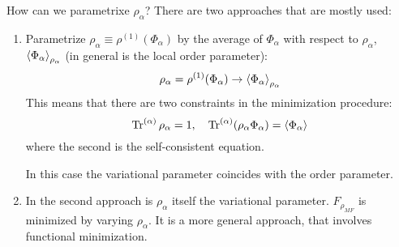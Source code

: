 \documentclass[../main/main.tex]{subfiles}
\begin{document}
How can we parametrixe \( \rho _ \alpha  \)?
There are two approaches that are mostly used:
\begin{enumerate}
\item Parametrize \( \rho _ \alpha \equiv \rho ^{(1)} (\Phi _ \alpha )\) by the average of \( \Phi _ \alpha  \) with respect to \( \rho _ \alpha  \), \( \expval{\Phi _ \alpha }_ { \rho _ \alpha }  \) (in general is the local order parameter):
\begin{equation*}
  \rho _ \alpha = \rho ^{(1)} ( \Phi _{\alpha })  \rightarrow  \expval{\Phi _ \alpha }_ {\rho _ \alpha }
\end{equation*}
This means that there are two constraints in the minimization procedure:
\begin{equation}
  \Tr^{(\alpha )} \rho _ \alpha = 1, \quad  \Tr^{(\alpha )}(\rho _ \alpha \Phi _ \alpha ) = \expval{\Phi _ \alpha }
\end{equation}
where the second is the self-consistent equation.
\begin{remark}
In this case the variational parameter coincides with the order parameter.
\end{remark}
\item In the second approach is \( \rho _ \alpha  \) itself the variational parameter.
\( F_{\rho _{MF}} \) is minimized by varying \( \rho _ \alpha  \). It is a more general approach, that involves functional minimization.
\end{enumerate}
\end{document}
